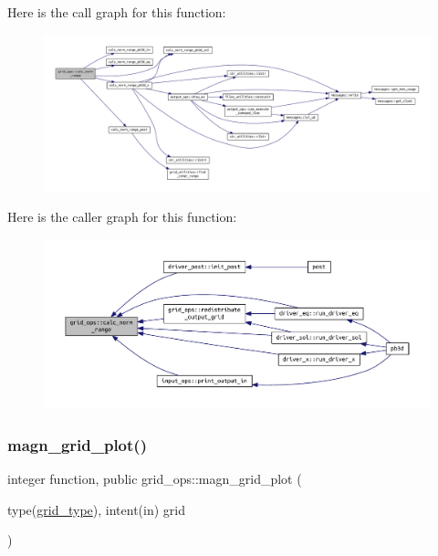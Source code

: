 Here is the call graph for this function\+:\nopagebreak
\begin{figure}[H]
\begin{center}
\leavevmode
\includegraphics[width=350pt]{namespacegrid__ops_a1c18f90f93f5fce7ebb4dba60b70e0f8_cgraph}
\end{center}
\end{figure}
Here is the caller graph for this function\+:\nopagebreak
\begin{figure}[H]
\begin{center}
\leavevmode
\includegraphics[width=350pt]{namespacegrid__ops_a1c18f90f93f5fce7ebb4dba60b70e0f8_icgraph}
\end{center}
\end{figure}
\mbox{\label{namespacegrid__ops_addd76b7b3be0b51e0863ae0cdfef41e6}} 
\subsubsection{\texorpdfstring{magn\+\_\+grid\+\_\+plot()}{magn\_grid\_plot()}}
{\footnotesize\ttfamily integer function, public grid\+\_\+ops\+::magn\+\_\+grid\+\_\+plot (\begin{DoxyParamCaption}\item[{type(\hyperlink{structgrid__vars_1_1grid__type}{grid\+\_\+type}), intent(in)}]{grid }\end{DoxyParamCaption})}



